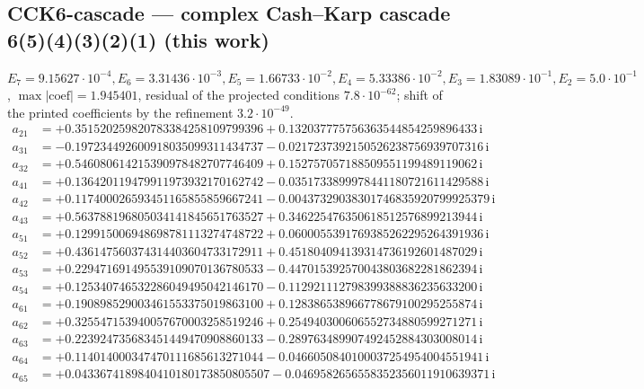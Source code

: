\subsection*{CCK6-cascade --- complex Cash--Karp cascade 6(5)(4)(3)(2)(1) (this work)}
$E_{7}=9.15627\cdot10^{-4}, E_{6}=3.31436\cdot10^{-3}, E_{5}=1.66733\cdot10^{-2}, E_{4}=5.33386\cdot10^{-2}, E_{3}=1.83089\cdot10^{-1}, E_{2}=5.0\cdot10^{-1}$, $\max|\text{coef}|=1.945401$, residual of the projected conditions $7.8\cdot10^{-62}$; shift of the printed coefficients by the refinement $3.2\cdot10^{-49}$. 
{\small
\begin{align*}
a_{21} &= +0.351520259820783384258109799396 + 0.132037775756363544854259896433\,\mathrm{i}\\
a_{31} &= -0.197234492600918035099311434737 - 0.0217237392150526238756939707316\,\mathrm{i}\\
a_{32} &= +0.546080614215390978482707746409 + 0.152757057188509551199489119062\,\mathrm{i}\\
a_{41} &= +0.136420119479911973932170162742 - 0.0351733899978441180721611429588\,\mathrm{i}\\
a_{42} &= +0.117400026593451165855859667241 - 0.00437329038301746835920799925379\,\mathrm{i}\\
a_{43} &= +0.563788196805034141845651763527 + 0.346225476350618512576899213944\,\mathrm{i}\\
a_{51} &= +0.129915006948698781113274748722 + 0.0600055391769385262295264391936\,\mathrm{i}\\
a_{52} &= +0.436147560374314403604733172911 + 0.451804094139314736192601487029\,\mathrm{i}\\
a_{53} &= +0.229471691495539109070136780533 - 0.447015392570043803682281862394\,\mathrm{i}\\
a_{54} &= +0.125340746532286049495042146170 - 0.112921112798399388836235633200\,\mathrm{i}\\
a_{61} &= +0.190898529003461553375019863100 + 0.128386538966778679100295255874\,\mathrm{i}\\
a_{62} &= +0.325547153940057670003258519246 + 0.254940300606552734880599271271\,\mathrm{i}\\
a_{63} &= +0.223924735683451449470908860133 - 0.289763489907492452884303008014\,\mathrm{i}\\
a_{64} &= +0.114014000347470111685613271044 - 0.0466050840100037254954004551941\,\mathrm{i}\\
a_{65} &= +0.0433674189840410180173850805507 - 0.0469582656558352356011910639371\,\mathrm{i}\\[1mm]

\end{align*}}
